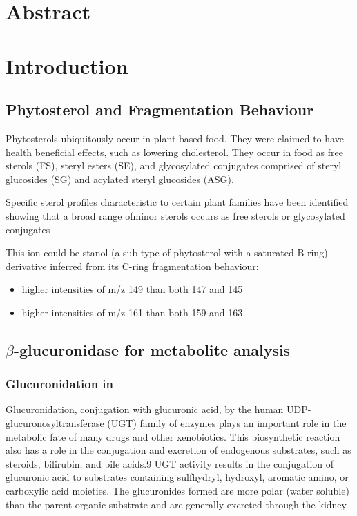 \section{Abstract}

\section{Introduction}
\subsection{Phytosterol and Fragmentation Behaviour}
Phytosterols ubiquitously occur in plant-based food\cite{sterolmsms}. They were claimed to have health beneficial effects, such as lowering cholesterol. They occur in food as free sterols (FS), steryl esters (SE), and glycosylated conjugates comprised of steryl glucosides (SG) and acylated steryl glucosides (ASG).

Specific sterol profiles characteristic to certain plant families have been identified showing that a broad range ofminor sterols occurs as free sterols or glycosylated conjugates

This ion could be stanol (a sub-type of phytosterol with a saturated B-ring) derivative inferred from its C-ring fragmentation behaviour: 
\begin{itemize}
	\item higher intensities of m/z 149 than both 147 and 145
	\item higher intensities of m/z 161 than both 159 and 163
\end{itemize}
 

\subsection{$\beta$-glucuronidase for metabolite analysis}
\subsubsection{Glucuronidation in }
Glucuronidation, conjugation with glucuronic acid, by the human UDP-glucuronosyltransferase (UGT) family of enzymes plays an important role in the metabolic fate of many drugs and other xenobiotics. This biosynthetic reaction also has a role in the conjugation and excretion of endogenous substrates, such as steroids, bilirubin, and bile acids.9 UGT activity results in the conjugation of glucuronic acid to substrates containing sulfhydryl, hydroxyl, aromatic amino, or carboxylic acid moieties. The glucuronides formed are more polar (water soluble) than the parent organic substrate and are generally excreted through the kidney.





